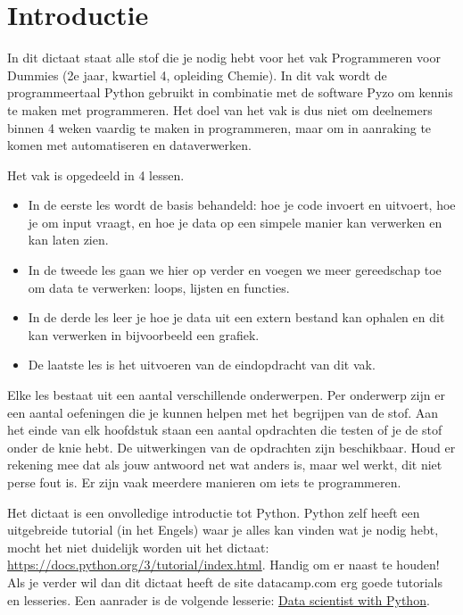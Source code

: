 \chapter*{Introductie}
In dit dictaat staat alle stof die je nodig hebt voor het vak Programmeren voor Dummies (2e jaar, kwartiel 4, opleiding Chemie). In dit vak wordt de programmeertaal Python gebruikt in combinatie met de software Pyzo om kennis te maken met programmeren. Het doel van het vak is dus niet om deelnemers binnen 4 weken vaardig te maken in programmeren, maar om in aanraking te komen met automatiseren en dataverwerken. 



Het vak is opgedeeld in 4 lessen.
\begin{itemize}
\item In de eerste les wordt de basis behandeld: hoe je code invoert en uitvoert, hoe je om input vraagt, en hoe je data op een simpele manier kan verwerken en kan laten zien. 
\item In de tweede les gaan we hier op verder en voegen we meer gereedschap toe om data te verwerken: loops, lijsten en functies. 
\item In de derde les leer je hoe je data uit een extern bestand kan ophalen en dit kan verwerken in bijvoorbeeld een grafiek. 
\item De laatste les is het uitvoeren van de eindopdracht van dit vak. 
\end{itemize}

Elke les bestaat uit een aantal verschillende onderwerpen. Per onderwerp zijn er een aantal oefeningen die je kunnen helpen met het begrijpen van de stof. Aan het einde van elk hoofdstuk staan een aantal opdrachten die testen of je de stof onder de knie hebt. De uitwerkingen van de opdrachten zijn beschikbaar. Houd er rekening mee dat als jouw antwoord net wat anders is, maar wel werkt, dit niet perse fout is. Er zijn vaak meerdere manieren om iets te programmeren.

Het dictaat is een onvolledige introductie tot Python. Python zelf heeft een uitgebreide tutorial (in het Engels) waar je alles kan vinden wat je nodig hebt, mocht het niet duidelijk worden uit het dictaat: \href{https://docs.python.org/3/tutorial/index.html}{https://docs.python.org/3/tutorial/index.html}. Handig om er naast te houden! Als je verder wil dan dit dictaat heeft de site datacamp.com erg goede tutorials en lesseries. Een aanrader is de volgende lesserie:
\href{https://www.datacamp.com/tracks/data-scientist-with-python}{Data scientist with Python}.

